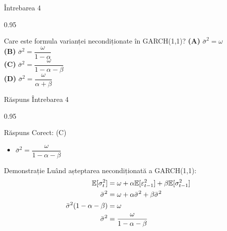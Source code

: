 \documentclass[9pt, aspectratio=169, t]{beamer}
\begin{document}
\begin{frame}{Întrebarea 4}
    \begin{cminipage}{0.95\textwidth}
    \begin{block}{Care este formula varianței necondiționate în GARCH(1,1)?}
        \textcolor{MainBlue}{\textbf{(A)}} $\bar{\sigma}^2 = \omega$\\[3pt]
        \textcolor{MainBlue}{\textbf{(B)}} $\bar{\sigma}^2 = \dfrac{\omega}{1 - \alpha}$\\[3pt]
        \textcolor{MainBlue}{\textbf{(C)}} $\bar{\sigma}^2 = \dfrac{\omega}{1 - \alpha - \beta}$\\[3pt]
        \textcolor{MainBlue}{\textbf{(D)}} $\bar{\sigma}^2 = \dfrac{\omega}{\alpha + \beta}$
    \end{block}
    \end{cminipage}
\end{frame}

\begin{frame}{Răspuns Întrebarea 4}
    \begin{cminipage}{0.95\textwidth}
    \begin{exampleblock}{Răspuns Corect: (C)}
        \begin{itemize}\setlength{\itemsep}{0pt}
            \item $\bar{\sigma}^2 = \dfrac{\omega}{1 - \alpha - \beta}$
        \end{itemize}
    \end{exampleblock}

    \pause
    \begin{block}{Demonstrație}
        Luând așteptarea necondiționată a GARCH(1,1):
        \begin{align*}
            \mathbb{E}[\sigma_t^2] &= \omega + \alpha \mathbb{E}[\varepsilon_{t-1}^2] + \beta \mathbb{E}[\sigma_{t-1}^2] \\
            \bar{\sigma}^2 &= \omega + \alpha \bar{\sigma}^2 + \beta \bar{\sigma}^2 \\
            \bar{\sigma}^2 (1 - \alpha - \beta) &= \omega \\
            \bar{\sigma}^2 &= \frac{\omega}{1 - \alpha - \beta}
        \end{align*}
    \end{block}
    \end{cminipage}
\end{frame}
\end{document}
